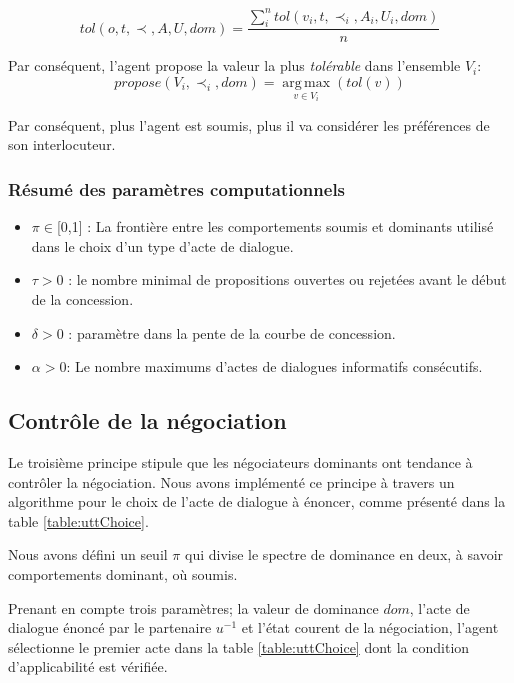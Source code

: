 	\begin{equation}
	tol(o, t, \prec, A, U, dom) = \frac{ \sum_{i}^{n} tol(v_i, t, \prec_i, A_i, U_i, dom) } {n}
	\end{equation}
	
	\noindent
	Par conséquent, l'agent propose la valeur la plus \emph{tolérable} dans l'ensemble $V_i$:
	\begin{equation}
	propose(V_i, \prec_i,dom) =  \operatorname*{arg\,max}_{v \in V_i} ( tol(v))
	\end{equation}
	
	Par conséquent, plus l'agent est soumis, plus il va considérer les préférences de son interlocuteur.
	
	\subsubsection*{Résumé des paramètres computationnels}
	\begin{itemize}[noitemsep]
		
		\item $\pi \in $[0,1] : La frontière entre  les comportements soumis et dominants utilisé dans le choix d'un type d'acte de dialogue.
		\item $\tau > 0$ : le nombre minimal de propositions ouvertes ou rejetées avant le début de la concession.
		\item $\delta > 0$ : paramètre dans la pente de la courbe de concession.
		\item $\alpha> 0$: Le nombre maximums d'actes de dialogues informatifs consécutifs.
	\end{itemize}
	
	\subsection{Contrôle de la négociation}
	
	Le troisième principe stipule que les négociateurs dominants ont tendance à contrôler la négociation.
	Nous avons implémenté ce principe à travers un algorithme pour le choix de l'acte de dialogue à énoncer, comme présenté dans la table \ref{table:uttChoice}.
	
	Nous avons défini un seuil $\pi$  qui divise le spectre de dominance en deux, à savoir comportements dominant, où soumis.
	
	Prenant en compte trois paramètres; la valeur de dominance $dom$, l'acte de dialogue énoncé par le partenaire $u^{-1}$ et l'état courent de la négociation, l'agent sélectionne le premier acte dans la table \ref{table:uttChoice} dont la condition d'applicabilité est vérifiée.  
	

